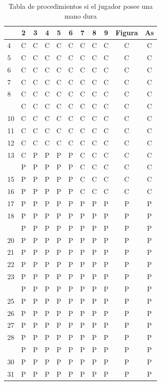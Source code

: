 \documentclass[12pt,a4paper,]{book}
\numberwithin{dummy}{section}
\theoremstyle{ocrenumbox}
\theoremstyle{blacknumex}
\theoremstyle{blacknumbox}
\theoremstyle{ocrenum}
\theoremstyle{ocrenum}
\begin{document}
\begin{longtable}[t]{lcccccccccc}
\caption{\label{tab:unnamed-chunk-5}Tabla de procedimientos si el jugador posee una mano dura}\\
\toprule
 & 2 & 3 & 4 & 5 & 6 & 7 & 8 & 9 & Figura & As\\
\midrule
4 & C & C & C & C & C & C & C & C & C & C\\
5 & C & C & C & C & C & C & C & C & C & C\\
6 & C & C & C & C & C & C & C & C & C & C\\
7 & C & C & C & C & C & C & C & C & C & C\\
8 & C & C & C & C & C & C & C & C & C & C\\
\addlinespace
9 & C & C & C & C & C & C & C & C & C & C\\
10 & C & C & C & C & C & C & C & C & C & C\\
11 & C & C & C & C & C & C & C & C & C & C\\
12 & C & C & C & C & C & C & C & C & C & C\\
13 & C & P & P & P & P & C & C & C & C & C\\
\addlinespace
14 & P & P & P & P & P & C & C & C & C & C\\
15 & P & P & P & P & P & C & C & C & C & C\\
16 & P & P & P & P & P & C & C & C & C & C\\
17 & P & P & P & P & P & P & P & P & P & P\\
18 & P & P & P & P & P & P & P & P & P & P\\
\addlinespace
19 & P & P & P & P & P & P & P & P & P & P\\
20 & P & P & P & P & P & P & P & P & P & P\\
21 & P & P & P & P & P & P & P & P & P & P\\
22 & P & P & P & P & P & P & P & P & P & P\\
23 & P & P & P & P & P & P & P & P & P & P\\
\addlinespace
24 & P & P & P & P & P & P & P & P & P & P\\
25 & P & P & P & P & P & P & P & P & P & P\\
26 & P & P & P & P & P & P & P & P & P & P\\
27 & P & P & P & P & P & P & P & P & P & P\\
28 & P & P & P & P & P & P & P & P & P & P\\
\addlinespace
29 & P & P & P & P & P & P & P & P & P & P\\
30 & P & P & P & P & P & P & P & P & P & P\\
31 & P & P & P & P & P & P & P & P & P & P\\
\bottomrule
\end{longtable}
\endgroup{}
\end{document}
